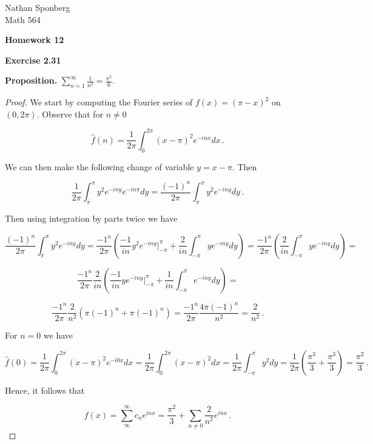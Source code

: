 \documentclass[a4paper]{article}
\numberwithin{equation}{section}
\begin{document}
\begin{flushright}
{\small{Nathan Sponberg\\}}
{\small{Math 564}}
\end{flushright}

\begin{center}
\bf{Homework 12}
\end{center}

\begin{description}

\item \textbf{Exercise 2.31}

\item \textbf{Proposition.} $\sum_{n=1}^{\infty}\frac{1}{n^2} = \frac{\pi^2}{6}$.

\item \begin{proof}	We start by computing the Fourier series of $f(x) = (\pi-x)^2$ on $(0,2\pi)$. Observe that for $n \neq 0$

$$\hat{f}(n) = \frac{1}{2\pi}\int_0^{2\pi}(x-\pi)^2e^{-inx}dx\,.$$

We can then make the following change of variable $y = x-\pi$. Then

$$\frac{1}{2\pi}\int_\pi^{\pi}y^2e^{-iny}e^{-in\pi}dy = \frac{(-1)^n}{2\pi}\int_\pi^{\pi}y^2e^{-iny}dy\,.$$

Then using integration by parts twice we have

$$\frac{(-1)^n}{2\pi}\int_\pi^{\pi}y^2e^{-iny}dy = \frac{-1^n}{2\pi}\left(\frac{-1}{in}y^2e^{-iny}\Big|_{-\pi}^\pi + \frac{2}{in}\int_{-\pi}^\pi ye^{-iny}dy\right) = \frac{-1^n}{2\pi}\left(\frac{2}{in}\int_{-\pi}^\pi ye^{-iny}dy\right) = $$

$$\frac{-1^n}{2\pi}\frac{2}{in}\left(\frac{-1}{in}ye^{-iny}\Big|_{-\pi}^\pi + \frac{1}{in}\int_{-\pi}^\pi e^{-iny}dy\right) = $$

$$\frac{-1^n}{2\pi}\frac{2}{n^2}\left(\pi(-1)^n + \pi(-1)^n\right) = \frac{-1^n}{2\pi}\frac{4\pi(-1)^n}{n^2} = \frac{2}{n^2}\,.$$

For $n = 0$ we have

$$\hat{f}(0) = \frac{1}{2\pi}\int_0^{2\pi}(x-\pi)^2e^{-i0x}dx = \frac{1}{2\pi}\int_0^{2\pi}(x-\pi)^2dx = \frac{1}{2\pi}\int_{-\pi}^{\pi}y^2dy = \frac{1}{2\pi}\left(\frac{\pi^3}{3} + \frac{\pi^3}{3}\right) = \frac{\pi^2}{3}\,.$$

Hence, it follows that

$$f(x) = \sum_\infty^\infty c_ne^{inx} = \frac{\pi^2}{3} + \sum_{n\neq 0}\frac{2}{n^2}e^{inx}\,.$$


\end{proof}
\end{description}
\end{document}
